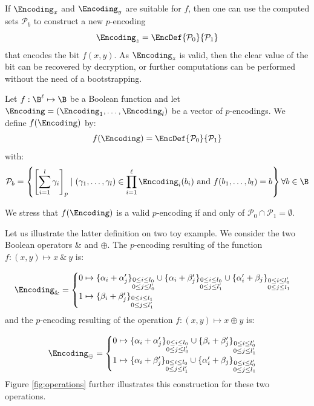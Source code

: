 If $\Encoding_x$ and $\Encoding_y$ are suitable for $f$, then one can use the computed sets $\mathcal{P}_b$ to construct a new $p$-encoding \[\Encoding_z = \EncDef{\mathcal{P}_0}{\mathcal{P}_1}\] that encodes the bit $f(x, y)$. As $\Encoding_z$ is valid, then the clear value of the bit can be recovered by decryption, or further computations can be performed without the need of a bootstrapping. 


\begin{definition}
    Let $f:\B^\ell \mapsto \B$ be a Boolean function and let $\Encoding = (\Encoding_1, \dots, \Encoding_l)$ be a vector of $p$-encodings. We define $f(\Encoding)$ by:
    \[f(\Encoding) = \EncDef{\mathcal{P}_0}{\mathcal{P}_1}\]
    with: 
    \[\mathcal{P}_b = \left \{ \left [ \sum_{i=1}^{l} \gamma_i \right ]_p \mid (\gamma_1, \dots, \gamma_l) \in \prod_{i=1}^\ell \Encoding_i(b_i) \text{ and } f(b_1, \dots, b_l) = b \right \} \forall b \in \B\]

We stress that $f(\Encoding)$ is a valid $p$-encoding if and only of $\mathcal{P}_0 \cap \mathcal{P}_1 = \emptyset$.
\end{definition}


Let us illustrate the latter definition on two toy example. We consider the two Boolean operators $\&$ and $\oplus$. The $p$-encoding resulting of the function $f: (x, y) \mapsto x ~\&~ y$ is: 

\begin{equation}
\Encoding_\& = \begin{cases}
0 \mapsto \{\alpha_i + \alpha'_j\}_{\substack{0\le i \le l_0 \\ 0 \le j \le l_0'}} \cup \{\alpha_i + \beta'_j\}_{\substack{0 \le i \le l_0 \\ 0 \le j \le l'_1}} \cup \{\alpha'_i + \beta_j\}_{\substack{0 \le i \le l'_0 \\ 0 \le j \le l_1}}\\
1 \mapsto \{\beta_i + \beta'_j\}_{\substack{0\le i \le l_1 \\ 0 \le j \le l_1'}}
\end{cases}
\label{eq:encoding_and}
\end{equation}
and the $p$-encoding resulting of the operation $f: (x, y) \mapsto x \oplus y$ is:

\begin{equation}
\Encoding_\oplus = \begin{cases}
0 \mapsto \{\alpha_i + \alpha'_j\}_{\substack{0\le i \le l_0 \\ 0 \le j \le l_0'}} \cup \{\beta_i + \beta'_j\}_{\substack{0 \le i \le l'_0 \\ 0 \le j \le l'_1}}\\
1 \mapsto \{\alpha_i + \beta'_j\}_{\substack{0\le i \le l_0 \\ 0 \le j \le l_1'}} \cup \{\alpha'_i + \beta_j\}_{\substack{0\le i \le l_0' \\ 0 \le j \le l_1}} \\
\end{cases}
\label{eq:encoding_xor}
\end{equation}
%
Figure \ref{fig:operations} further illustrates this construction for these two operations.

